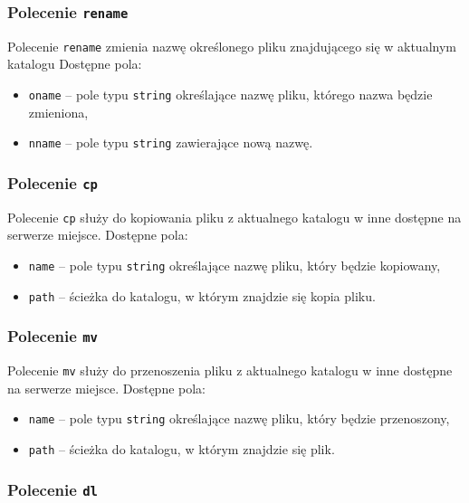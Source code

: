 \documentclass[10pt,a4paper]{article}
\begin{document}
\subsubsection{Polecenie \texttt{rename}}
Polecenie \texttt{rename} zmienia nazwę określonego pliku znajdującego się w aktualnym katalogu Dostępne pola:
\begin{itemize}
    \item \texttt{oname} -- pole typu \texttt{string} określające nazwę pliku, którego nazwa będzie zmieniona,
    \item \texttt{nname} -- pole typu \texttt{string} zawierające nową nazwę.
\end{itemize}

\subsubsection{Polecenie \texttt{cp}}
Polecenie \texttt{cp} służy do kopiowania pliku z aktualnego katalogu w inne dostępne na serwerze miejsce. Dostępne pola:
\begin{itemize}
    \item \texttt{name} -- pole typu \texttt{string} określające nazwę pliku, który będzie kopiowany,
    \item \texttt{path} -- ścieżka do katalogu, w którym znajdzie się kopia pliku.
\end{itemize}

\subsubsection{Polecenie \texttt{mv}}
Polecenie \texttt{mv} służy do przenoszenia pliku z aktualnego katalogu w inne dostępne na serwerze miejsce. Dostępne pola:
\begin{itemize}
    \item \texttt{name} -- pole typu \texttt{string} określające nazwę pliku, który będzie przenoszony,
    \item \texttt{path} -- ścieżka do katalogu, w którym znajdzie się plik.
\end{itemize}

\subsubsection{Polecenie \texttt{dl}}



\end{document}
